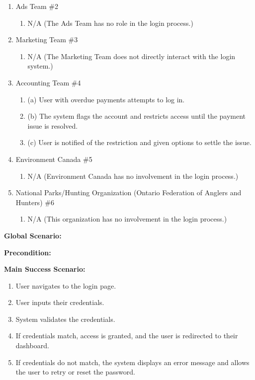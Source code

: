 \documentclass[]{article}
\begin{document}
\begin{enumerate}[{\bf BE1.}]
\begin{enumerate}[{\bf VP1.}]
\item Ads Team \#2 \
\begin{enumerate}
\item N/A (The Ads Team has no role in the login process.)
\end{enumerate}
 
\item Marketing Team \#3 \
\begin{enumerate}
\item N/A (The Marketing Team does not directly interact with the login system.)
\end{enumerate}
 
\item Accounting Team \#4 \
\begin{enumerate}
\item (a) User with overdue payments attempts to log in.
\item (b) The system flags the account and restricts access until the payment issue is resolved.
\item (c) User is notified of the restriction and given options to settle the issue.
\end{enumerate}
 
\item Environment Canada \#5 
\begin{enumerate}
\item N/A (Environment Canada has no involvement in the login process.)
\end{enumerate}
 
\item National Parks/Hunting Organization (Ontario Federation of Anglers and Hunters) \#6 \
\begin{enumerate}
\item N/A (This organization has no involvement in the login process.)
\end{enumerate}
\end{enumerate}
 
\textbf{Global Scenario:}
 
\textbf{Precondition:}
 
\textbf{Main Success Scenario:}
\begin{enumerate}
\item User navigates to the login page.
\item User inputs their credentials.
\item System validates the credentials.
\item If credentials match, access is granted, and the user is redirected to their dashboard.
\item If credentials do not match, the system displays an error message and allows the user to retry or reset the password.
\end{enumerate}
 

\end{enumerate}
\end{document}
